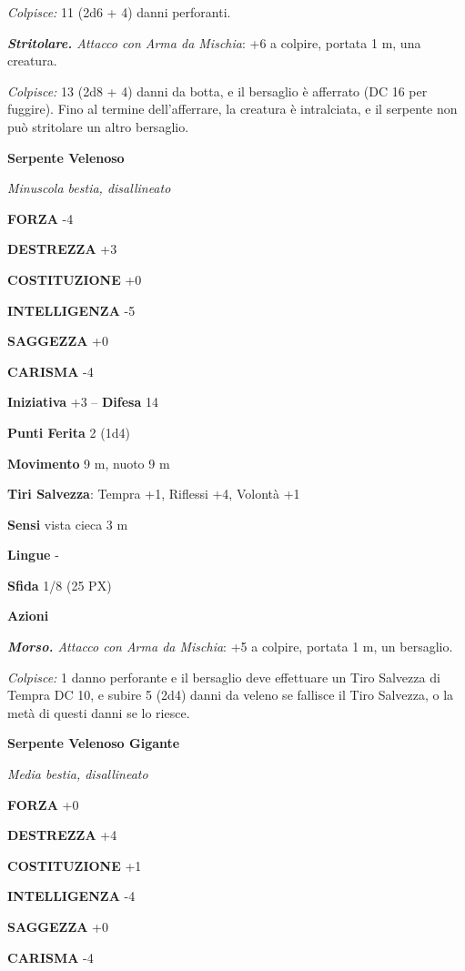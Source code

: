 \begin{multicols}{2}
	\textit{Colpisce:} 11 (2d6 + 4) danni perforanti.

	\textit{\textbf{Stritolare.} Attacco con Arma da Mischia}: +6 a colpire, portata 1 m, una creatura.

	\textit{Colpisce:} 13 (2d8 + 4) danni da botta, e il bersaglio è afferrato (DC 16 per fuggire). Fino al termine dell'afferrare, la creatura è intralciata, e il serpente non può stritolare un altro bersaglio.

	\medskip\textbf{Serpente Velenoso}

	\textit{Minuscola bestia, disallineato}

	\textbf{FORZA} -4

	\textbf{DESTREZZA} +3

	\textbf{COSTITUZIONE} +0

	\textbf{INTELLIGENZA} -5

	\textbf{SAGGEZZA} +0

	\textbf{CARISMA} -4

	\textbf{Iniziativa} +3 -- \textbf{Difesa} 14

	\textbf{Punti Ferita} 2 (1d4)

	\textbf{Movimento} 9 m, nuoto 9 m

	\textbf{Tiri Salvezza}: Tempra +1, Riflessi +4, Volontà +1

	\textbf{Sensi} vista cieca 3 m

	\textbf{Lingue} -

	\textbf{Sfida} 1/8 (25 PX)

	\textbf{Azioni}

	\textit{\textbf{Morso.} Attacco con Arma da Mischia}: +5 a colpire, portata 1 m, un bersaglio.

	\textit{Colpisce:} 1 danno perforante e il bersaglio deve effettuare un Tiro Salvezza di Tempra DC 10, e subire 5 (2d4) danni da veleno se fallisce il Tiro Salvezza, o la metà di questi danni se lo riesce.

	\medskip\textbf{Serpente Velenoso Gigante}

	\textit{Media bestia, disallineato}

	\textbf{FORZA} +0

	\textbf{DESTREZZA} +4

	\textbf{COSTITUZIONE} +1

	\textbf{INTELLIGENZA} -4

	\textbf{SAGGEZZA} +0

	\textbf{CARISMA} -4


\end{multicols}
